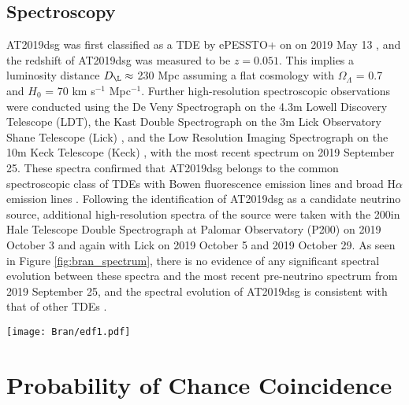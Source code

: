 \subsection*{Spectroscopy}

AT2019dsg was first classified as a TDE by ePESSTO+ on on 2019 May 13 , and the redshift of AT2019dsg was measured to be $z=0.051$. This implies a luminosity distance $D_{\L} \approx$ 230 Mpc assuming a flat cosmology with $\Omega_{\Lambda}$ = 0.7 and $H_{0}$ = 70 km s$^{-1}$ Mpc$^{-1}$.  Further high-resolution spectroscopic observations were conducted using the De Veny Spectrograph on the 4.3m Lowell Discovery Telescope (LDT), the Kast Double Spectrograph on the 3m Lick Observatory Shane Telescope (Lick) , and the Low Resolution Imaging Spectrograph on the 10m Keck Telescope (Keck) , with the most recent spectrum on 2019 September 25. These spectra confirmed that AT2019dsg belongs to the common spectroscopic class of TDEs with Bowen fluorescence emission lines and broad H$\alpha$ emission lines \cite{van_velzen_20}. Following the identification of AT2019dsg as a candidate neutrino source, additional high-resolution spectra of the source were taken with the 200in Hale Telescope Double Spectrograph at Palomar Observatory (P200) on 2019 October 3 and again with  Lick on 2019 October 5 and 2019 October 29. As seen in Figure \ref{fig:bran_spectrum}, there is no evidence of any significant spectral evolution between these spectra and the most recent pre-neutrino spectrum from 2019 September 25, and the spectral evolution of AT2019dsg is consistent with that of other TDEs \cite{van_velzen_20}. 

\begin{figure*}[h!]
	\centering \texttt{[image: Bran/edf1.pdf]}
	\caption{The spectroscopic evolution of AT2019dsg, beginning with the publicly available classification spectrum taken with the NTT \cite{2019ATel12752....1N}, and further spectra from LDT, Lick, Keck and P200. The Balmer lines are highlighted in cyan, the HeII lines in gray, and the Bowen fluorescence lines (OIII at 3760\AA, NIII at 4100\AA ~and 4640\AA) in black. Telluric lines are marked with +.}
	\label{fig:bran_spectrum}
\end{figure*}

\section{Probability of Chance Coincidence}

